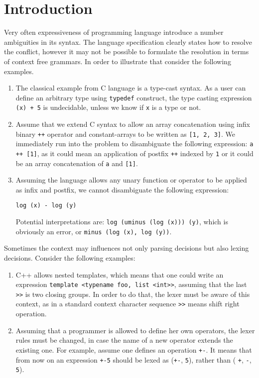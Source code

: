 \section{\label{sec:intro}Introduction}

Very often expressiveness of programming language introduce a number
ambiguities in its syntax.  The language specification clearly states
how to resolve the conflict, however it may not be possible to 
formulate the resolution in terms of context free grammars.  In order
to illustrate that consider the following examples.

\begin{enumerate}
    \item The classical example from C language is a type-cast 
          syntax.  As a user can define an arbitrary type using
          \verb|typedef| construct, the type casting expression
          \verb|(x) + 5| is undecidable, unless we know if
          \verb|x| is a type or not.
    \item Assume that we extend C syntax to allow an array 
          concatenation using infix binary \verb|++| operator and
          constant-arrays to be written as \verb|[1, 2, 3]|.
          We immediately run into the problem to disambiguate the 
          following expression: \verb|a ++ [1]|, as it could mean
          an application of postfix \verb|++| indexed by \verb|1|
          or it could be an array concatenation of \verb|a| and 
          \verb|[1]|.
    \item Assuming the language allows any unary function or operator
          to be applied as infix and postfix, we cannot 
          disambiguate the following expression:
\begin{verbatim}
log (x) - log (y)
\end{verbatim}
          Potential interpretations are: 
          \verb|log (uminus (log (x))) (y)|, which is obviously an 
          error, or \verb|minus (log (x), log (y))|.
\end{enumerate}

\noindent
Sometimes the context may influences not only parsing decisions but 
also lexing decisions.  Consider the following examples:
\begin{enumerate}
    \item C++ allows nested templates, which means that one could
          write an expression \verb|template <typename foo, list <int>>|, 
          assuming that the last \verb|>>| is two closing groups.  In
          order to do that, the lexer must be aware of this context,
          as in a standard context character sequence \verb|>>| means
          shift right operation.
    \item Assuming that a programmer is allowed to define her own 
          operators, the lexer rules must be changed, in case 
          the name of a new operator extends the existing one.  For
          example, assume one defines an operation \verb|+-|.
          It means that from now on an expression \verb|+-5| should
          be lexed as (\verb|+-|, \verb|5|), rather than (%
          \verb|+|, \verb|-|, \verb|5|).
\end{enumerate}

